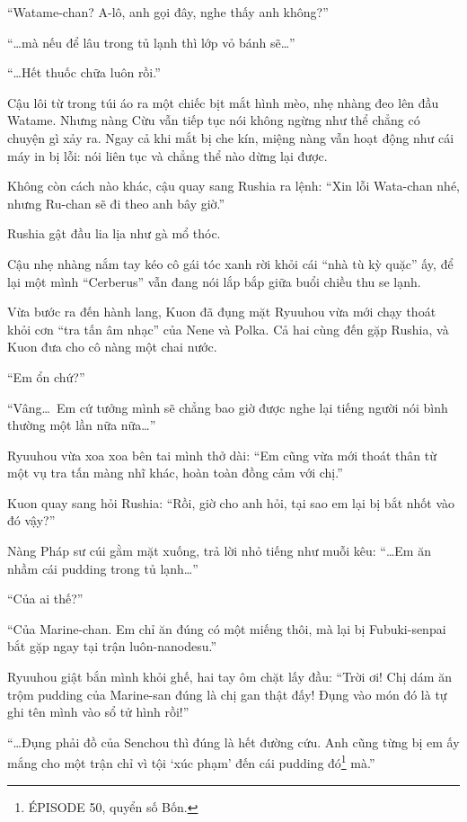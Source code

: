 \documentclass[../main.tex]{subfiles}
\begin{document}
``Watame-chan? A-lô, anh gọi đây, nghe thấy anh không?''

``\dots mà nếu để lâu trong tủ lạnh thì lớp vỏ bánh sẽ\dots''

``\dots Hết thuốc chữa luôn rồi.''

Cậu lôi từ trong túi áo ra một chiếc bịt mắt hình mèo, nhẹ nhàng đeo lên đầu Watame. Nhưng nàng Cừu vẫn tiếp tục nói không ngừng như thể chẳng có chuyện gì xảy ra. Ngay cả khi mắt bị che kín, miệng nàng vẫn hoạt động như cái máy in bị lỗi: nói liên tục và chẳng thể nào dừng lại được.

Không còn cách nào khác, cậu quay sang Rushia ra lệnh: ``Xin lỗi Wata-chan nhé, nhưng Ru-chan sẽ đi theo anh bây giờ.''

Rushia gật đầu lia lịa như gà mổ thóc.

Cậu nhẹ nhàng nắm tay kéo cô gái tóc xanh rời khỏi cái ``nhà tù kỳ quặc'' ấy, để lại một mình ``Cerberus'' vẫn đang nói lắp bắp giữa buổi chiều thu se lạnh.

\ct

Vừa bước ra đến hành lang, Kuon đã đụng mặt Ryuuhou vừa mới chạy thoát khỏi cơn ``tra tấn âm nhạc'' của Nene và Polka. Cả hai cùng đến gặp Rushia, và Kuon đưa cho cô nàng một chai nước.

``Em ổn chứ?''

``Vâng\dots\ Em cứ tưởng mình sẽ chẳng bao giờ được nghe lại tiếng người nói bình thường một lần nữa nữa\dots''

Ryuuhou vừa xoa xoa bên tai mình thở dài: ``Em cũng vừa mới thoát thân từ một vụ tra tấn màng nhĩ khác, hoàn toàn đồng cảm với chị.''

Kuon quay sang hỏi Rushia: ``Rồi, giờ cho anh hỏi, tại sao em lại bị bắt nhốt vào đó vậy?''

Nàng Pháp sư cúi gằm mặt xuống, trả lời nhỏ tiếng như muỗi kêu: ``\dots Em ăn nhầm cái pudding trong tủ lạnh\dots''

``Của ai thế?''

``Của Marine-chan. Em chỉ ăn đúng có một miếng thôi, mà lại bị Fubuki-senpai bắt gặp ngay tại trận luôn-nanodesu.''

Ryuuhou giật bắn mình khỏi ghế, hai tay ôm chặt lấy đầu: ``Trời ơi! Chị dám ăn trộm pudding của Marine-san đúng là chị gan thật đấy! Đụng vào món đó là tự ghi tên mình vào sổ tử hình rồi!''

``\dots Đụng phải đồ của Senchou thì đúng là hết đường cứu. Anh cũng từng bị em ấy mắng cho một trận chỉ vì tội `xúc phạm' đến cái pudding đó\footnote{{\flaregothic ÉPISODE 50}, quyển số Bốn.} mà.''
\end{document}
